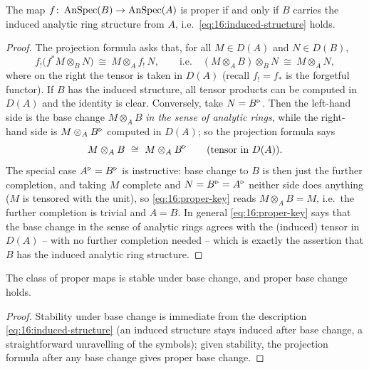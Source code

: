 \begin{proposition}[Properness $=$ inducedness]
\label{prop:16:proper-induced}
The map $f\colon\operatorname{AnSpec}(B)\to\operatorname{AnSpec}(A)$ is proper if and only if $B$ carries the
induced analytic ring structure from $A$, i.e.\ \eqref{eq:16:induced-structure} holds.
\end{proposition}

\begin{proof}
The projection formula asks that, for all $M\in D(A)$ and $N\in D(B)$,
\begin{equation*}
f_!\bigl(f^*M\otimes_B N\bigr)\ \cong\ M\otimes_A f_!\,N,\qquad
\text{i.e.}\quad (M\otimes_A B)\otimes_B N\ \cong\ M\otimes_A N,
\end{equation*}
where on the right the tensor is taken in $D(A)$ (recall $f_!=f_*$ is the forgetful
functor). If $B$ has the induced structure, all tensor products can be computed in
$D(A)$ and the identity is clear. Conversely, take $N=B^{\triangleright}$. Then the left-hand side
is the base change $M\otimes_A B$ \emph{in the sense of analytic rings}, while the
right-hand side is $M\otimes_AB^{\triangleright}$ computed in $D(A)$; so the projection formula says
\begin{equation}
\label{eq:16:proper-key}
M\otimes_A B\ \cong\ M\otimes_AB^{\triangleright}\qquad(\text{tensor in }D(A)).
\end{equation}
The special case $A^{\triangleright}=B^{\triangleright}$ is instructive: base change to $B$ is then just the
further completion, and taking $M$ complete and $N=B^{\triangleright}=A^{\triangleright}$ neither side does
anything ($M$ is tensored with the unit), so \eqref{eq:16:proper-key} reads $M\otimes_A
B=M$, i.e.\ the further completion is trivial and $A=B$. In general
\eqref{eq:16:proper-key} says that the base change in the sense of analytic rings
agrees with the (induced) tensor in $D(A)$ -- with no further completion needed -- which
is exactly the assertion that $B$ has the induced analytic ring structure.
\end{proof}

\begin{corollary}
\label{cor:16:proper-base-change}
The class of proper maps is stable under base change, and proper base change holds.
\end{corollary}

\begin{proof}
Stability under base change is immediate from the description
\eqref{eq:16:induced-structure} (an induced structure stays induced after base change,
a straightforward unravelling of the symbols); given stability, the projection formula
after any base change gives proper base change.
\end{proof}


